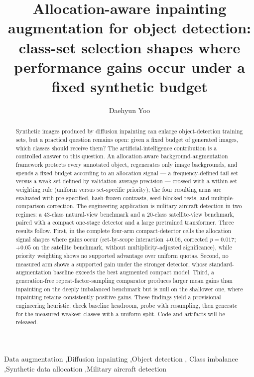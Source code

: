 \documentclass[preprint,12pt,authoryear]{elsarticle}
\begin{document}
\begin{frontmatter}

\title{Allocation-aware inpainting augmentation for object detection:
class-set selection shapes where performance gains occur under a fixed
synthetic budget}

\author[a]{Daehyun Yoo}

\begin{abstract}
Synthetic images produced by diffusion inpainting can enlarge
object-detection training sets, but a practical question remains open:
given a fixed budget of generated images, which classes should receive
them? The artificial-intelligence contribution is a controlled answer to
this question. An allocation-aware
background-augmentation framework protects every annotated object,
regenerates only image backgrounds, and spends a fixed budget according
to an allocation signal --- a frequency-defined tail set
versus a weak set defined by validation average precision --- crossed
with a within-set weighting rule (uniform versus set-specific
priority); the four resulting arms are evaluated with pre-specified,
hash-frozen contrasts, seed-blocked tests, and multiple-comparison
correction. The engineering application is military aircraft detection
in two regimes: a 43-class natural-view benchmark and a 20-class satellite-view benchmark, paired
with a compact one-stage detector and a large pretrained transformer.
Three results follow. First, in the complete four-arm compact-detector
cells the allocation signal shapes where gains occur (set-by-scope
interaction $+0.06$, corrected $p = 0.017$; $+0.05$ on the satellite
benchmark, without multiplicity-adjusted significance), while priority weighting shows no
supported advantage over uniform quotas. Second, no measured arm shows a supported gain under the stronger
detector, whose standard-augmentation baseline exceeds the best
augmented compact model. Third, a generation-free
repeat-factor-sampling comparator produces larger mean gains than
inpainting on the deeply imbalanced benchmark but is null on the
shallower one, where inpainting retains consistently positive gains.
These findings yield a provisional engineering heuristic: check
baseline headroom, probe with resampling, then generate for the
measured-weakest classes with a uniform split. Code and artifacts will be
released.
\end{abstract}

\begin{keyword}
Data augmentation \sep Diffusion inpainting \sep Object detection \sep
Class imbalance \sep Synthetic data allocation \sep Military aircraft
detection
\end{keyword}

\end{frontmatter}
\end{document}
